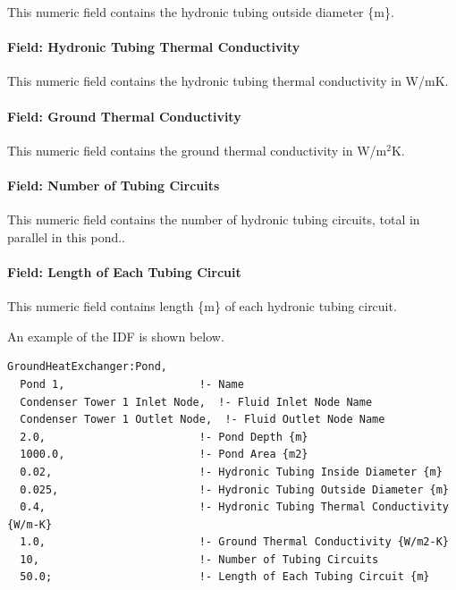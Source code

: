 This numeric field contains the hydronic tubing outside diameter \{m\}.

\paragraph{Field: Hydronic Tubing Thermal Conductivity}\label{field-hydronic-tubing-thermal-conductivity}

This numeric field contains the hydronic tubing thermal conductivity in W/mK.

\paragraph{Field: Ground Thermal Conductivity}\label{field-ground-thermal-conductivity-1}

This numeric field contains the ground thermal conductivity in W/m\(^{2}\)K.

\paragraph{Field: Number of Tubing Circuits}\label{field-number-of-tubing-circuits}

This numeric field contains the number of hydronic tubing circuits, total in parallel in this pond..

\paragraph{Field: Length of Each Tubing Circuit}\label{field-length-of-each-tubing-circuit}

This numeric field contains length \{m\} of each hydronic tubing circuit.

An example of the IDF is shown below.

\begin{lstlisting}
GroundHeatExchanger:Pond,
  Pond 1,                     !- Name
  Condenser Tower 1 Inlet Node,  !- Fluid Inlet Node Name
  Condenser Tower 1 Outlet Node,  !- Fluid Outlet Node Name
  2.0,                        !- Pond Depth {m}
  1000.0,                     !- Pond Area {m2}
  0.02,                       !- Hydronic Tubing Inside Diameter {m}
  0.025,                      !- Hydronic Tubing Outside Diameter {m}
  0.4,                        !- Hydronic Tubing Thermal Conductivity {W/m-K}
  1.0,                        !- Ground Thermal Conductivity {W/m2-K}
  10,                         !- Number of Tubing Circuits
  50.0;                       !- Length of Each Tubing Circuit {m}
\end{lstlisting}

